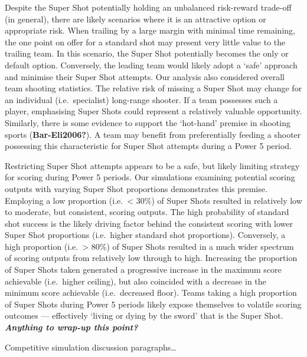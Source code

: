 \documentclass[]{elsarticle} %
\begin{document}
Despite the Super Shot potentially holding an unbalanced risk-reward
trade-off (in general), there are likely scenarios where it is an
attractive option or appropriate risk. When trailing by a large margin
with minimal time remaining, the one point on offer for a standard shot
may present very little value to the trailing team. In this scenario,
the Super Shot potentially becomes the only or default option.
Conversely, the leading team would likely adopt a `safe' approach and
minimise their Super Shot attempts. Our analysis also considered overall
team shooting statistics. The relative risk of missing a Super Shot may
change for an individual (i.e.~specialist) long-range shooter. If a team
possesses such a player, emphasising Super Shots could represent a
relatively valuable opportunity. Similarly, there is some evidence to
support the `hot-hand' premise in shooting sports
(\textbf{Bar-Eli2006?}). A team may benefit from preferentially feeding
a shooter possessing this characteristic for Super Shot attempts during
a Power 5 period.

Restricting Super Shot attempts appears to be a safe, but likely
limiting strategy for scoring during Power 5 periods. Our simulations
examining potential scoring outputs with varying Super Shot proportions
demonstrates this premise. Employing a low proportion (i.e.~\textless{}
30\%) of Super Shots resulted in relatively low to moderate, but
consistent, scoring outputs. The high probability of standard shot
success is the likely driving factor behind the consistent scoring with
lower Super Shot proportions (i.e.~higher standard shot proportions).
Conversely, a high proportion (i.e.~\textgreater{} 80\%) of Super Shots
resulted in a much wider spectrum of scoring outputs from relatively low
through to high. Increasing the proportion of Super Shots taken
generated a progressive increase in the maximum score achievable
(i.e.~higher ceiling), but also coincided with a decrease in the minimum
score achievable (i.e.~decreased floor). Teams taking a high proportion
of Super Shots during Power 5 periods likely expose themselves to
volatile scoring outcomes --- effectively `living or dying by the sword'
that is the Super Shot. \textbf{\emph{Anything to wrap-up this point?}}

Competitive simulation discussion paragraphs\ldots{}
\end{document}
